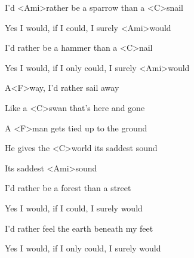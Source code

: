 

\zs
I'd <Ami>rather be a sparrow than a <C>snail

Yes I would, if I could, I surely <Ami>would

I'd rather be a hammer than a <C>nail

Yes I would, if I only could, I surely <Ami>would
\ks

\zr
A<F>way, I'd rather sail away

Like a <C>swan that's here and gone

A <F>man gets tied up to the ground

He gives the <C>world its saddest sound

Its saddest <Ami>sound
\kr

\zs
I'd rather be a forest than a street

Yes I would, if I could, I surely would

I'd rather feel the earth beneath my feet

Yes I would, if I only could, I surely would
\ks

\zr\kr

\kp
